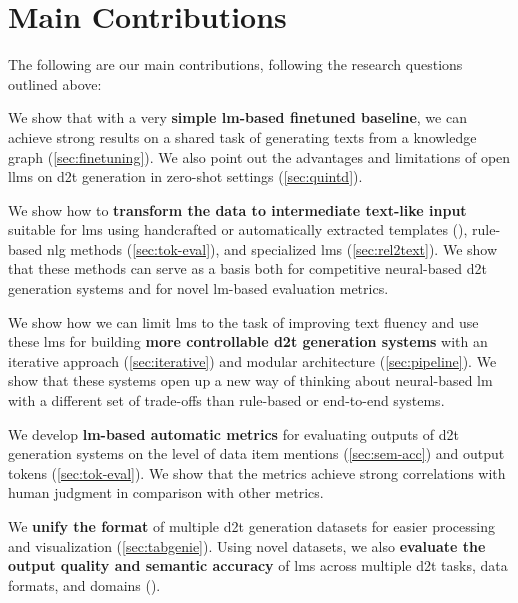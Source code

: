 \section{Main Contributions}
\label{sec:contributions}


The following are our main contributions, following the research questions outlined above:

\begin{description}[leftmargin=\widthof{\textbf{Ad RQ1\ \ }}]
    \item[Ad \ref{rq:1}] We show that  with a very \textbf{simple \ac{lm}-based finetuned baseline}, we can achieve strong results on a shared task of generating texts from a knowledge graph (\autoref{sec:finetuning}). We also point out the advantages and limitations of open \acp{llm} on \ac{d2t} generation in zero-shot settings (\autoref{sec:quintd}).
    \item[Ad \ref{rq:2}] We show how to \textbf{transform the data to intermediate text-like input} suitable for \acp{lm} using handcrafted or automatically extracted templates (), rule-based \ac{nlg} methods (\autoref{sec:tok-eval}), and specialized \acp{lm} (\autoref{sec:rel2text}). We show that these methods can serve as a basis both for competitive neural-based \ac{d2t} generation systems and for novel \ac{lm}-based evaluation metrics.
    \item[Ad \ref{rq:3}] We show how we can limit \acp{lm} to the task of improving text fluency and use these \acp{lm} for building \textbf{more controllable \ac{d2t} generation systems} with an iterative approach (\autoref{sec:iterative}) and modular architecture (\autoref{sec:pipeline}). We show that these systems open up a new way of thinking about neural-based \ac{lm} with a different set of trade-offs than rule-based or end-to-end systems.
    \item[Ad \ref{rq:4}] We develop \textbf{\ac{lm}-based automatic metrics} for evaluating outputs of \ac{d2t} generation systems on the level of data item mentions (\autoref{sec:sem-acc}) and output tokens (\autoref{sec:tok-eval}). We show that the metrics achieve strong correlations with human judgment in comparison with other metrics.
    \item[Ad \ref{rq:5}] We \textbf{unify the format} of multiple \ac{d2t} generation datasets for easier processing and visualization (\autoref{sec:tabgenie}). Using novel datasets, we also \textbf{evaluate the output quality and semantic accuracy} of \acp{lm} across multiple \ac{d2t} tasks, data formats, and domains ().
\end{description}



